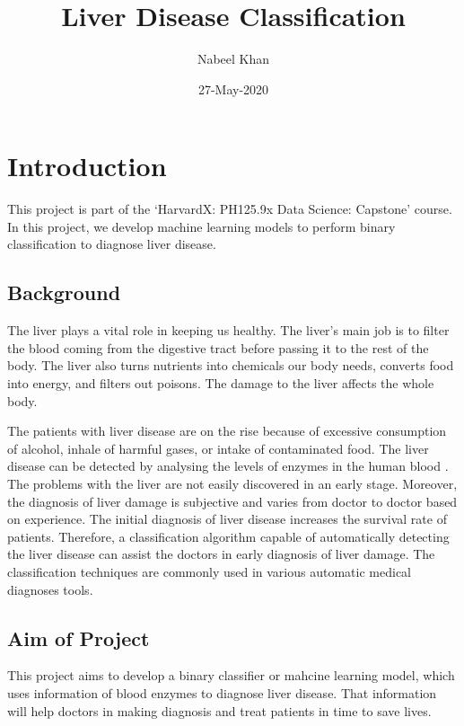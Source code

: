 \documentclass[]{article}
\title{Liver Disease Classification}
\author{Nabeel Khan}
\date{27-May-2020}
\begin{document}
\maketitle

{
\setcounter{tocdepth}{2}
\tableofcontents
}
\section{Introduction}
\label{sec:introduction}

This project is part of the `HarvardX: PH125.9x Data Science: Capstone'
course. In this project, we develop machine learning models to perform
binary classification to diagnose liver disease.

\subsection{Background}
\label{sec:background}

The liver plays a vital role in keeping us healthy. The liver's main job
is to filter the blood coming from the digestive tract before passing it
to the rest of the body. The liver also turns nutrients into chemicals
our body needs, converts food into energy, and filters out poisons. The
damage to the liver affects the whole body.

The patients with liver disease are on the rise because of excessive
consumption of alcohol, inhale of harmful gases, or intake of
contaminated food. The liver disease can be detected by analysing the
levels of enzymes in the human blood \cite{ld,bendi}. The problems with
the liver are not easily discovered in an early stage. Moreover, the
diagnosis of liver damage is subjective and varies from doctor to doctor
based on experience. The initial diagnosis of liver disease increases
the survival rate of patients. Therefore, a classification algorithm
capable of automatically detecting the liver disease can assist the
doctors in early diagnosis of liver damage. The classification
techniques are commonly used in various automatic medical diagnoses
tools\cite{cad}.

\subsection{Aim of Project}
\label{sec:aim}

This project aims to develop a binary classifier or mahcine learning
model, which uses information of blood enzymes to diagnose liver
disease. That information will help doctors in making diagnosis and
treat patients in time to save lives.
\end{document}
